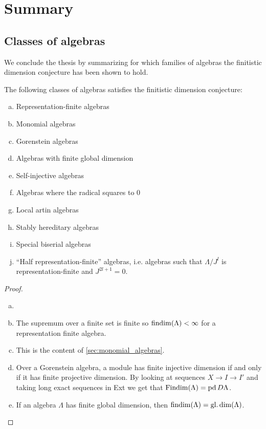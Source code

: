 \section{Summary}
\subsection{Classes of algebras}

We conclude the thesis by summarizing for which families of algebras the finitistic dimension conjecture has been shown to hold.

\begin{theorem}
	The following classes of algebras satisfies the finitistic dimension conjecture:
	\begin{enumerate}[a)]
		\item Representation-finite algebras
		\item Monomial algebras
		\item Gorenstein algebras
		\item Algebras with finite global dimension
		\item Self-injective algebras
		\item Algebras where the radical squares to 0
		\item Local artin algebras
		\item Stably hereditary algebras
		\item Special biserial algebras
		\item ``Half representation-finite'' algebras, i.e. algebras such that $\Lambda/J^l$ is representation-finite and $J^{2l+1}=0$.
	\end{enumerate}
	\begin{proof}
		\begin{enumerate}[(a)]
			\item[]
			\item The supremum over a finite set is finite so $\operatorname{findim}(\Lambda) < \infty$ for a representation finite algebra.
			\item This is the content of \cref{sec:monomial_algebras}.
			\item Over a Gorenstein algebra, a module has finite injective dimension if and only if it has finite projective dimension. By looking at sequences $X \to I \to I'$ and taking long exact sequences in Ext we get that $\operatorname{Findim}(\Lambda) = \operatorname{pd} D\Lambda$. 
			\item If an algebra $\Lambda$ has finite global dimension, then $\operatorname{findim}(\Lambda) = \operatorname{gl.dim}(\Lambda)$.

\end{enumerate}
\end{proof}
\end{theorem}
